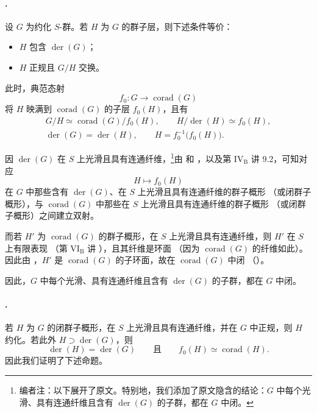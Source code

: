 \paragraph{.}
设 \(G\) 为约化 \(S\)-群。若 \(H\) 为 \(G\) 的群子层，则下述条件等价：
\begin{itemize}
\item \(H\) 包含 \(\operatorname{der}(G)\)；
\item \(H\) 正规且 \(G/H\) 交换。
\end{itemize}
此时，典范态射
\[
  f_0:G\longrightarrow\operatorname{corad}(G)
\]
将 \(H\) 映满到 \(\operatorname{corad}(G)\) 的子层 \(f_0(H)\)，且有
\[
\begin{gathered}
  G/H\simeq\operatorname{corad}(G)/f_0(H),
  \qquad
  H/\operatorname{der}(H)\simeq f_0(H),\\
  \operatorname{der}(G)=\operatorname{der}(H),
  \qquad
  H=f_0^{-1}\bigl(f_0(H)\bigr).
\end{gathered}
\]

因 \(\operatorname{der}(G)\) 在 \(S\) 上光滑且具有连通纤维，\setcounter{footnote}{63}\footnote{编者注：以下展开了原文。特别地，我们添加了原文隐含的结论：\(G\) 中每个光滑、具有连通纤维且含有 \(\operatorname{der}(G)\) 的子群，都在 \(G\) 中闭。}由  和 ，以及第 \(\mathrm{IV_B}\) 讲 9.2，可知对应
\[
  H\longmapsto f_0(H)
\]
在 \(G\) 中那些含有 \(\operatorname{der}(G)\)、在 \(S\) 上光滑且具有连通纤维的群子概形 \textup{（或闭群子概形）}，与 \(\operatorname{corad}(G)\) 中那些在 \(S\) 上光滑且具有连通纤维的群子概形 \textup{（或闭群子概形）}之间建立双射。

而若 \(H'\) 为 \(\operatorname{corad}(G)\) 的群子概形，在 \(S\) 上光滑且具有连通纤维，则 \(H'\) 在 \(S\) 上有限表现 \textup{（第 \(\mathrm{VI_B}\) 讲 ）}，且其纤维是环面 \textup{（因为 \(\operatorname{corad}(G)\) 的纤维如此）}。因此由 ，\(H'\) 是 \(\operatorname{corad}(G)\) 的子环面，故在 \(\operatorname{corad}(G)\) 中闭 \textup{（）}。

因此，\(G\) 中每个光滑、具有连通纤维且含有 \(\operatorname{der}(G)\) 的子群，都在 \(G\) 中闭。

\paragraph{.}
若 \(H\) 为 \(G\) 的闭群子概形，在 \(S\) 上光滑且具有连通纤维，并在 \(G\) 中正规，则 \(H\) 约化。若此外 \(H\supset\operatorname{der}(G)\)，则
\[
  \operatorname{der}(H)=\operatorname{der}(G)
  \qquad\text{且}\qquad
  f_0(H)\simeq\operatorname{corad}(H).
\]
因此我们证明了下述命题。

